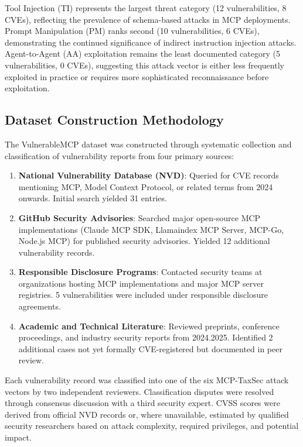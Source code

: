 \documentclass[12pt,twocolumn,journal]{IEEEtran}
\begin{document}
Tool Injection (TI) represents the largest threat category (12 vulnerabilities, 8 CVEs), reflecting the prevalence of schema-based attacks in MCP deployments. Prompt Manipulation (PM) ranks second (10 vulnerabilities, 6 CVEs), demonstrating the continued significance of indirect instruction injection attacks. Agent-to-Agent (AA) exploitation remains the least documented category (5 vulnerabilities, 0 CVEs), suggesting this attack vector is either less frequently exploited in practice or requires more sophisticated reconnaissance before exploitation.

\subsection{Dataset Construction Methodology}

The VulnerableMCP dataset was constructed through systematic collection and classification of vulnerability reports from four primary sources:

\begin{enumerate}
\item \textbf{National Vulnerability Database (NVD)}: Queried for CVE records mentioning MCP, Model Context Protocol, or related terms from 2024 onwards. Initial search yielded 31 entries.

\item \textbf{GitHub Security Advisories}: Searched major open-source MCP implementations (Claude MCP SDK, Llamaindex MCP Server, MCP-Go, Node.js MCP) for published security advisories. Yielded 12 additional vulnerability records.

\item \textbf{Responsible Disclosure Programs}: Contacted security teams at organizations hosting MCP implementations and major MCP server registries. 5 vulnerabilities were included under responsible disclosure agreements.

\item \textbf{Academic and Technical Literature}: Reviewed preprints, conference proceedings, and industry security reports from 2024.2025. Identified 2 additional cases not yet formally CVE-registered but documented in peer review.
\end{enumerate}

Each vulnerability record was classified into one of the six MCP-TaxSec attack vectors by two independent reviewers. Classification disputes were resolved through consensus discussion with a third security expert. CVSS scores were derived from official NVD records or, where unavailable, estimated by qualified security researchers based on attack complexity, required privileges, and potential impact.
\end{document}
